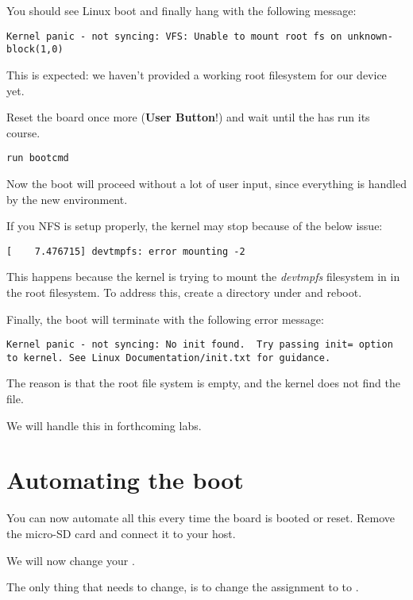 You should see Linux boot and finally hang with the following message:

\begin{verbatim}
Kernel panic - not syncing: VFS: Unable to mount root fs on unknown-block(1,0)
\end{verbatim}

This is expected: we haven't provided a working root filesystem for
our device yet.

Reset the board once more ({\bf User Button}!) and wait until the 
 has run its course.

\begin{verbatim}
run bootcmd
\end{verbatim}

Now the boot will proceed without a lot of user input, since everything is
handled by the new environment.

If you NFS is setup properly, the kernel may stop because of the below issue:

\begin{verbatim}
[    7.476715] devtmpfs: error mounting -2
\end{verbatim}

This happens because the kernel is trying to mount the {\em devtmpfs}
filesystem in  in the root filesystem. To address this,
create a  directory under  and reboot.

Finally, the boot will terminate with the following error message:

\begin{verbatim}
Kernel panic - not syncing: No init found.  Try passing init= option to kernel. See Linux Documentation/init.txt for guidance. 
\end{verbatim}

The reason is that the root file system is empty, and the kernel does not find the  file.

We will handle this in forthcoming labs.
\clearpage
\section{Automating the boot}

You can now automate all this every time the board is booted or
reset. Remove the micro-SD card and connect it to your host.

We will now change your .

The only thing that needs to change, is to change
the assignment to  to .

